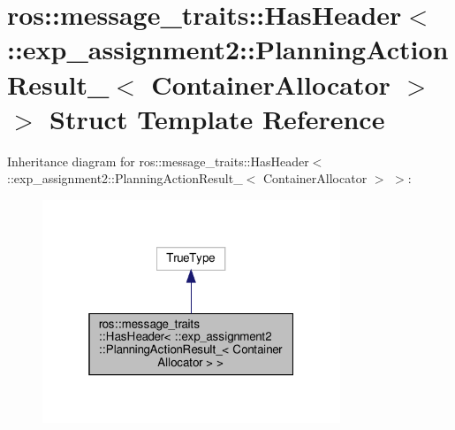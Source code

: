 \hypertarget{structros_1_1message__traits_1_1HasHeader_3_01_1_1exp__assignment2_1_1PlanningActionResult___3_01ContainerAllocator_01_4_01_4}{}\section{ros\+:\+:message\+\_\+traits\+:\+:Has\+Header$<$ \+:\+:exp\+\_\+assignment2\+:\+:Planning\+Action\+Result\+\_\+$<$ Container\+Allocator $>$ $>$ Struct Template Reference}
\label{structros_1_1message__traits_1_1HasHeader_3_01_1_1exp__assignment2_1_1PlanningActionResult___3_01ContainerAllocator_01_4_01_4}


Inheritance diagram for ros\+:\+:message\+\_\+traits\+:\+:Has\+Header$<$ \+:\+:exp\+\_\+assignment2\+:\+:Planning\+Action\+Result\+\_\+$<$ Container\+Allocator $>$ $>$\+:
\nopagebreak
\begin{figure}[H]
\begin{center}
\leavevmode
\includegraphics[width=253pt]{structros_1_1message__traits_1_1HasHeader_3_01_1_1exp__assignment2_1_1PlanningActionResult___3_0378574c234f754e858583e87ed114986}
\end{center}
\end{figure}


